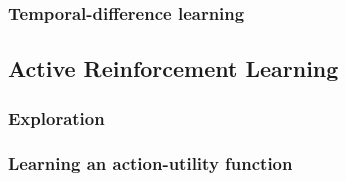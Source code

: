 \documentclass[11pt]{article}
\begin{document}
\subsubsection{Temporal-difference learning}

\subsection{Active Reinforcement Learning}

\subsubsection{Exploration}

\subsubsection{Learning an action-utility function}

\newpage
\listoftodos
\end{document}
